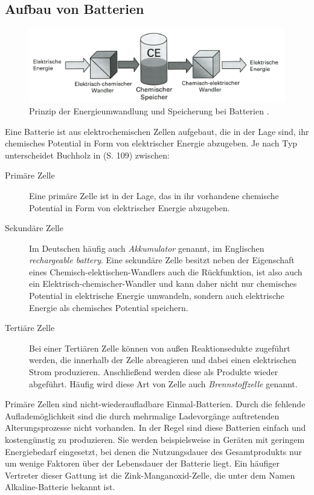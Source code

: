 \documentclass[a4paper, 11pt, headsepline,footsepline,twoside,abstract]{scrbook}
\begin{document}
\subsection{Aufbau von Batterien}
\begin{figure}[b]
	\centering
	\includegraphics[width=1\columnwidth]{images/Prinzipieller_Aufbau.png}
	\caption{Prinzip der Energieumwandlung und Speicherung bei Batterien \cite{jossen_2006}.}
	\label{Prinzip Batterie}
\end{figure}
Eine Batterie ist aus elektrochemischen Zellen aufgebaut, die in der Lage sind, ihr chemisches Potential in Form von elektrischer Energie abzugeben. Je nach Typ unterscheidet Buchholz in \cite{buchholz2010} (S. 109) zwischen:
\begin{description}
\item[Primäre Zelle] Eine primäre Zelle ist in der Lage, das in ihr vorhandene chemische Potential in Form von elektrischer Energie abzugeben.
\item[Sekundäre Zelle] Im Deutschen häufig auch \textit{Akkumulator} genannt, im Englischen \textit{rechargeable battery}. Eine sekundäre Zelle besitzt neben der Eigenschaft eines Chemisch-elektischen-Wandlers auch die Rückfunktion, ist also auch ein Elektrisch-chemischer-Wandler und kann daher nicht nur chemisches Potential in elektrische Energie umwandeln, sondern auch elektrische Energie als chemisches Potential speichern.
\item[Tertiäre Zelle]  Bei einer Tertiären Zelle können von außen Reaktionsedukte zugeführt werden, die innerhalb der Zelle abreagieren und dabei einen elektrischen Strom produzieren. Anschließend werden diese als Produkte wieder abgeführt. Häufig wird diese Art von Zelle auch \textit{Brennstoffzelle} genannt.
\end{description}
Primäre Zellen sind nicht-wiederaufladbare Einmal-Batterien. Durch die fehlende Auflademöglichkeit sind die durch mehrmalige Ladevorgänge auftretenden Alterungsprozesse nicht vorhanden. In der Regel sind diese Batterien einfach und kostengünstig zu produzieren. Sie werden beispielsweise in Geräten mit geringem Energiebedarf eingesetzt, bei denen die Nutzungsdauer des Gesamtprodukts nur um wenige Faktoren über der Lebensdauer der Batterie liegt. Ein häufiger Vertreter dieser Gattung ist die Zink-Manganoxid-Zelle, die unter dem Namen Alkaline-Batterie bekannt ist. 
\end{document}
